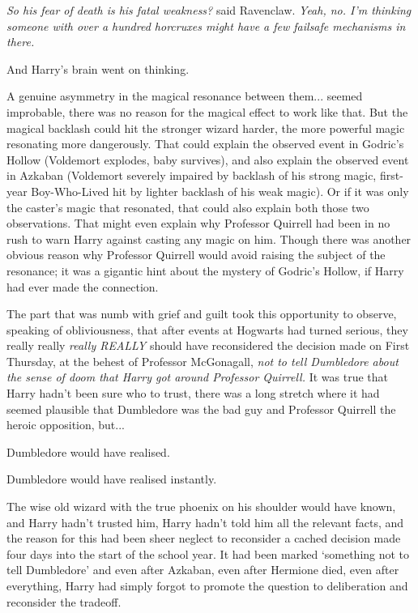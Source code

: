 \emph{So his fear of death is his fatal weakness?} said Ravenclaw. \emph{Yeah, no. I'm thinking someone with over a hundred horcruxes might have a few failsafe mechanisms in there.}

And Harry's brain went on thinking.

A genuine asymmetry in the magical resonance between them... seemed improbable, there was no reason for the magical effect to work like that. But the magical backlash could hit the stronger wizard harder, the more powerful magic resonating more dangerously. That could explain the observed event in Godric's Hollow (Voldemort explodes, baby survives), and also explain the observed event in Azkaban (Voldemort severely impaired by backlash of his strong magic, first-year Boy-Who-Lived hit by lighter backlash of his weak magic). Or if it was only the caster's magic that resonated, that could also explain both those two observations. That might even explain why Professor Quirrell had been in no rush to warn Harry against casting any magic on him. Though there was another obvious reason why Professor Quirrell would avoid raising the subject of the resonance; it was a gigantic hint about the mystery of Godric's Hollow, if Harry had ever made the connection.

The part that was numb with grief and guilt took this opportunity to observe, speaking of obliviousness, that after events at Hogwarts had turned serious, they really really \emph{really REALLY} should have reconsidered the decision made on First Thursday, at the behest of Professor McGonagall, \emph{not to tell Dumbledore about the sense of doom that Harry got around Professor Quirrell.} It was true that Harry hadn't been sure who to trust, there was a long stretch where it had seemed plausible that Dumbledore was the bad guy and Professor Quirrell the heroic opposition, but...

Dumbledore would have realised.

Dumbledore would have realised instantly.

The wise old wizard with the true phoenix on his shoulder would have known, and Harry hadn't trusted him, Harry hadn't told him all the relevant facts, and the reason for this had been sheer neglect to reconsider a cached decision made four days into the start of the school year. It had been marked `something not to tell Dumbledore' and even after Azkaban, even after Hermione died, even after everything, Harry had simply forgot to promote the question to deliberation and reconsider the tradeoff.

